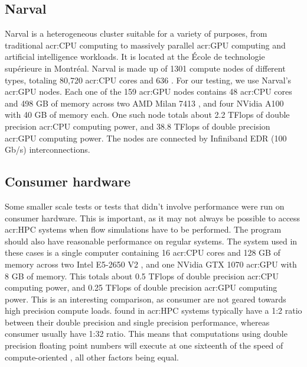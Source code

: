 \subsection{Narval} \label{subsection:results:platforms:narval}

Narval is a heterogeneous cluster suitable for a variety of purposes, from traditional
\acrshort{acr:CPU} computing to massively parallel \acrshort{acr:GPU} computing and artificial
intelligence workloads. It is located at the École de technologie supérieure in Montréal. Narval is
made up of 1301 compute nodes of different types, totaling 80,720 \acrshort{acr:CPU} cores and 636
. For our testing, we use Narval's \acrshort{acr:GPU} nodes. Each one of the 159
\acrshort{acr:GPU} nodes contains 48 \acrshort{acr:CPU} cores and 498 GB of memory across two AMD
Milan 7413 , and four NVidia A100  with 40 GB of memory
each. One such node totals about 2.2 TFlops of double precision \acrshort{acr:CPU} computing power,
and 38.8 TFlops of double precision \acrshort{acr:GPU} computing power. The nodes are connected by
Infiniband EDR (100 Gb/s) interconnections.

\subsection{Consumer hardware} \label{subsection:results:platforms:consumer}

Some smaller scale tests or tests that didn't involve performance were run on consumer hardware.
This is important, as it may not always be possible to access \acrshort{acr:HPC} systems when flow
simulations have to be performed. The program should also have reasonable performance on regular
systems. The system used in these cases is a single computer containing 16 \acrshort{acr:CPU} cores
and 128 GB of memory across two Intel E5-2650 V2 , and one NVidia GTX 1070
\acrshort{acr:GPU} with 8 GB of memory. This totals about 0.5 TFlops of double precision
\acrshort{acr:CPU} computing power, and 0.25 TFlops of double precision \acrshort{acr:GPU} computing
power. This is an interesting comparison, as consumer  are not geared towards
high precision compute loads.  found in \acrshort{acr:HPC} systems typically
have a 1:2 ratio between their double precision and single precision performance, whereas consumer
 usually have 1:32 ratio. This means that computations using double precision
floating point numbers will execute at one sixteenth of the speed of compute-oriented
, all other factors being equal.

